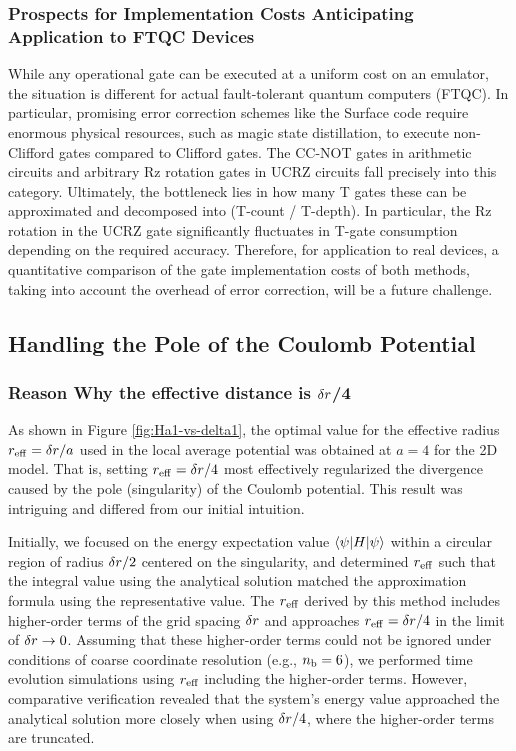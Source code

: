 \documentclass[wabun2025.tex]{subfiles}
\begin{document}
\subsubsection{Prospects for Implementation Costs Anticipating Application to FTQC Devices}
While any operational gate can be executed at a uniform cost on an emulator, the
situation is different for actual fault-tolerant quantum computers (FTQC). In
particular, promising error correction schemes like the Surface code require
enormous physical resources, such as magic state distillation, to execute
non-Clifford gates compared to Clifford gates. The CC-NOT gates in arithmetic
circuits and arbitrary Rz rotation gates in UCRZ circuits fall precisely into
this category. Ultimately, the bottleneck lies in how many T gates these can be
approximated and decomposed into (T-count / T-depth). In particular, the Rz
rotation in the UCRZ gate significantly fluctuates in T-gate consumption
depending on the required accuracy. Therefore, for application to real devices,
a quantitative comparison of the gate implementation costs of both methods,
taking into account the overhead of error correction, will be a future
challenge.

\subsection{Handling the Pole of the Coulomb Potential}
\label{sec:coulomb-potential-handling-analysis}
\subsubsection{Reason Why the effective distance is $\delta r$/4}
As shown in Figure \ref{fig:Ha1-vs-delta1}, the optimal value for the effective
radius $r_{\mathrm{eff}}=\delta r/a$ used in the local average potential was obtained at
$a=4$ for the 2D model. That is, setting $r_{\mathrm{eff}}=\delta r/4$ most effectively
regularized the divergence caused by the pole (singularity) of the Coulomb
potential. This result was intriguing and differed from our initial intuition.

Initially, we focused on the energy expectation value $\braket{\psi|H|\psi}$
within a circular region of radius $\delta r/2$ centered on the singularity, and
determined $r_{\mathrm{eff}}$ such that the integral value using the analytical solution
matched the approximation formula using the representative value. The $r_{\mathrm{eff}}$
derived by this method includes higher-order terms of the grid spacing $\delta r$
and approaches $r_{\mathrm{eff}}=\delta r/4$ in the limit of $\delta r\rightarrow0$. Assuming
that these higher-order terms could not be ignored under conditions of coarse
coordinate resolution (e.g., $n_{\mathrm{b}}=6$), we performed time evolution simulations
using $r_{\mathrm{eff}}$ including the higher-order terms. However, comparative
verification revealed that the system's energy value approached the analytical
solution more closely when using $\delta r/4$, where the higher-order terms are
truncated.
\end{document}
